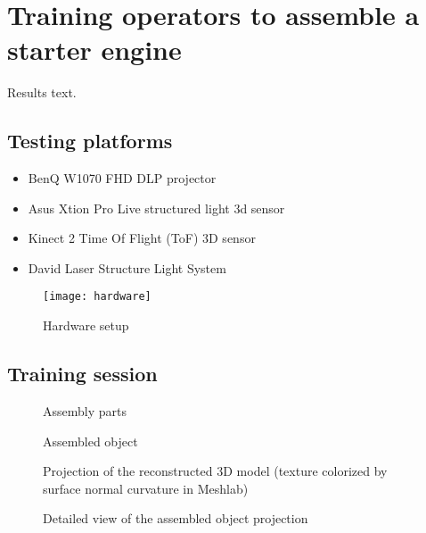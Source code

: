 \section{Training operators to assemble a starter engine}\label{sec:results}

Results text.

\subsection{Testing platforms}

\begin{itemize}
	\item BenQ W1070 FHD DLP projector
	\item Asus Xtion Pro Live structured light 3d sensor
	\item Kinect 2 Time Of Flight (ToF) 3D sensor
	\item David Laser Structure Light System
\end{itemize}

\begin{figure}[ht]
	\centering
	\texttt{[image: hardware]}
	\caption{Hardware setup}
	\label{fig:hardware}
\end{figure}


\subsection{Training session}

\begin{figure}[H]
	\begin{floatrow}[2]
		{\caption{Assembly parts}\label{fig:assembly-parts}}
		{\caption{Assembled object}\label{fig:assembled-object}}
	\end{floatrow}
\end{figure}

\begin{figure}[H]
	\begin{floatrow}[2]
		{\caption{Projection of the reconstructed 3D model (texture colorized by surface normal curvature in Meshlab)}\label{fig:projection-mapping-1}}
		{\caption{Detailed view of the assembled object projection}\label{fig:projection-mapping-2}}
	\end{floatrow}
\end{figure}


